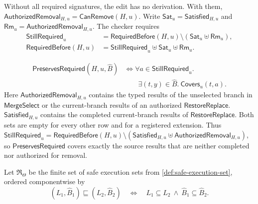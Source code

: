 \begin{definition}
\[\]
Without all required signatures, the edit has no derivation.
With them, \(\mathsf{AuthorizedRemoval}_{H,u}=\mathsf{CanRemove}(H,u)\).
Write \(\mathsf{Sat}_u=\mathsf{Satisfied}_{H,u}\) and
\(\mathsf{Rm}_u=\mathsf{AuthorizedRemoval}_{H,u}\).
The checker requires
{\small
\[
\begin{aligned}
\mathsf{StillRequired}_u
 &=\mathsf{RequiredBefore}(H,u)
   \setminus(\mathsf{Sat}_u\uplus\mathsf{Rm}_u),\\
\mathsf{RequiredBefore}(H,u)
 &=\mathsf{StillRequired}_u
   \uplus\mathsf{Sat}_u\uplus\mathsf{Rm}_u.
\end{aligned}
\]
}
\end{definition}

\begin{definition}
\label{app:spc}
\[
\begin{aligned}
\mathsf{PreservesRequired}(H,u,\widehat B)
&\Longleftrightarrow
\forall a\in\mathsf{StillRequired}_u.\\[-2pt]
&\qquad\exists(t,y)\in\widehat B.\
\mathsf{Covers}_u(t,a).
\end{aligned}
\]
Here \(\mathsf{AuthorizedRemoval}_{H,u}\) contains the typed results of the unselected branch in \(\mathsf{MergeSelect}\) or the current-branch results of an authorized \(\mathsf{RestoreReplace}\).
\(\mathsf{Satisfied}_{H,u}\) contains the completed current-branch results of \(\mathsf{RestoreReplace}\).
Both sets are empty for every other row and for a registered extension.
Thus \(\mathsf{StillRequired}_u=\mathsf{RequiredBefore}(H,u)\setminus(\mathsf{Satisfied}_{H,u}\uplus\mathsf{AuthorizedRemoval}_{H,u})\), so \(\mathsf{PreservesRequired}\) covers exactly the source results that are neither completed nor authorized for removal.
\end{definition}
Let \(\mathfrak R_\Theta\) be the finite set of safe execution sets from \cref{def:safe-execution-set}, ordered componentwise by
\[
 (L_1,\widehat B_1)\sqsubseteq(L_2,\widehat B_2)
 \quad\Longleftrightarrow\quad
 L_1\subseteq L_2\ \land\ \widehat B_1\subseteq\widehat B_2 .
\]

